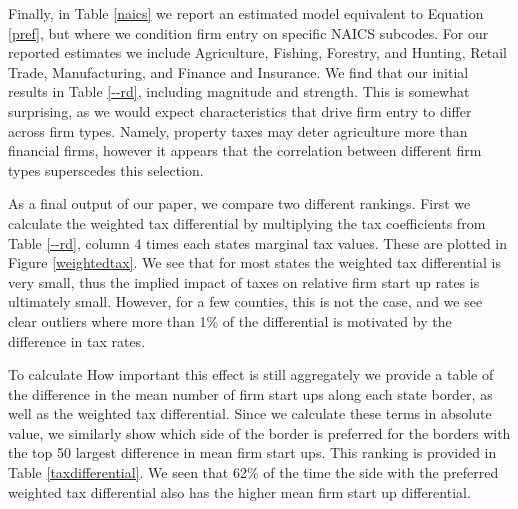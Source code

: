 Finally, in Table \ref{naics} we report an estimated model equivalent to Equation \ref{pref}, but where we condition firm entry on specific NAICS subcodes. For our reported estimates we include Agriculture, Fishing, Forestry, and Hunting, Retail Trade, Manufacturing, and Finance and Insurance. We find that our initial results in Table \ref{--rd}, including magnitude and strength. This is somewhat surprising, as we would expect characteristics that drive firm entry to differ across firm types. Namely, property taxes may deter agriculture more than financial firms, however it appears that the correlation between different firm types superscedes this selection.

As a final output of our paper, we compare two different rankings. First we calculate the weighted tax differential by multiplying the tax coefficients from Table \ref{--rd}, column 4 times each states marginal tax values. These are plotted in Figure \ref{weightedtax}. We see that for most states the weighted tax differential is very small, thus the implied impact of taxes on relative firm start up rates is ultimately small. However, for a few counties, this is not the case, and we see clear outliers where more than 1\% of the differential is motivated by the difference in tax rates. 

To calculate How important this effect is still aggregately we provide a table of the difference in the mean number of firm start ups along each state border, as well as the weighted tax differential. Since we calculate these terms in absolute value, we similarly show which side of the border is preferred for the borders with the top 50 largest difference in mean firm start ups. This ranking is provided in Table \ref{taxdifferential}. We seen that 62\% of the time the side with the preferred weighted tax differential also has the higher mean firm start up differential.
